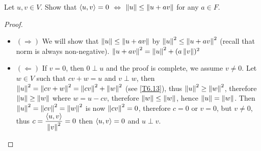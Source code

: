 \documentclass[../main.tex]{subfiles}
\begin{document}
\begin{exercise}
  Let $u, v \in V$. Show that $\langle u , v\rangle = 0$ $\iff$ $\left\Vert u \right\Vert \le \left\Vert u + av \right\Vert$ for any $a \in F$.
\end{exercise}
\begin{proof}
  ~
  \begin{itemize}
    \item $(\Rightarrow)$ We will show that $\left\Vert u \right\Vert \le \left\Vert u + av \right\Vert$ by $\left\Vert u \right\Vert^2 \le \left\Vert u + av \right\Vert^2$
          (recall that norm is always non-negative).
          $\left\Vert u + av \right\Vert^2 = \left\Vert u \right\Vert^2 + (a\left\Vert v \right\Vert)^2$
    \item $(\Leftarrow)$ If $v = 0$, then $0 \perp u$ and the proof is complete, we assume $v \neq 0$. Let $w \in V$ such that $cv + w = u$ and $v \perp w$,
          then $\left\Vert u \right\Vert^2 = \left\Vert cv + w \right\Vert^2 = \left\Vert cv \right\Vert^2 + \left\Vert w \right\Vert^2$ (see \cref{T6.13}), thus $\left\Vert u \right\Vert^2 \ge \left\Vert w \right\Vert^2$,
          therefore $\left\Vert u \right\Vert \ge \left\Vert w \right\Vert$ where $w = u - cv$, therefore $\left\Vert w \right\Vert \le \left\Vert w \right\Vert$,
          hence $\left\Vert u \right\Vert = \left\Vert w \right\Vert$.
          Then $\left\Vert u \right\Vert^2 = \left\Vert cv \right\Vert^2 = \left\Vert w \right\Vert^2$ is now $\left\Vert cv \right\Vert^2 = 0$, therefore $c = 0$ or $v = 0$, but $v \neq 0$,
          thus $c = \displaystyle \frac{\langle u , v\rangle}{\left\Vert v \right\Vert^2} = 0$ then $\langle u , v\rangle = 0$ and $u \perp v$.
  \end{itemize}
\end{proof}
\end{document}
